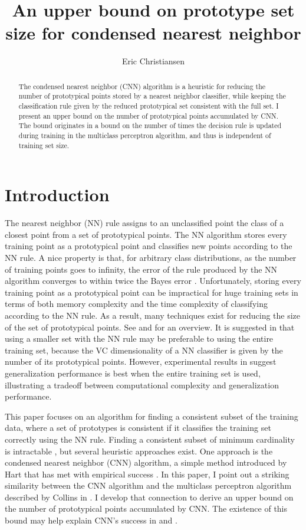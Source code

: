 \documentclass{article}
\title{An upper bound on prototype set size for condensed nearest neighbor}
\author{Eric Christiansen}
\begin{document}
\maketitle


\begin{abstract}
The condensed nearest neighbor (CNN) algorithm is a heuristic for reducing the number of prototypical points stored by a nearest neighbor classifier, while keeping the classification rule given by the reduced prototypical set consistent with the full set.
I present an upper bound on the number of prototypical points accumulated by CNN. The bound originates in a bound on the number of times the decision rule is updated during training in the multiclass perceptron algorithm, and thus is independent of training set size.
\end{abstract}

\section{Introduction}
The nearest neighbor (NN) rule assigns to an unclassified point the class of a closest point from a set of prototypical points. The NN algorithm stores every training point as a prototypical point and classifies new points according to the NN rule. 
A nice property is that, for arbitrary class distributions, as the number of training points goes to infinity, the error of the rule produced by the NN algorithm converges to within twice the Bayes error \cite{Devroye}. 
Unfortunately, storing every training point as a prototypical point can be impractical for huge training sets in terms of both memory complexity and the time complexity of classifying according to the NN rule. As a result, many techniques exist for reducing the size of the set of prototypical points. See \cite{Wilson} and \cite{Toussaint} for an overview. It is suggested in \cite{Angiulli} that using a smaller set with the NN rule may be preferable to using the entire training set, because the VC dimensionality of a NN classifier is given by the number of its prototypical points. However, experimental results in \cite{Wilson} suggest generalization performance is best when the entire training set is used, illustrating a tradeoff between computational complexity and generalization performance. 

This paper focuses on an algorithm for finding a consistent subset of the training data, where a set of prototypes is consistent if it classifies the training set correctly using the NN rule. Finding a consistent subset of minimum cardinality is intractable \cite{Wilfong}, but several heuristic approaches exist. One approach is the condensed nearest neighbor (CNN) algorithm, a simple method introduced by Hart \cite{HartCNN} that has met with empirical success \cite{Angiulli}\cite{Wilson}. In this paper, I point out a striking similarity between the CNN algorithm and the multiclass perceptron algorithm described by Collins in \cite{CollinsPerceptron}. I develop that connection to derive an upper bound on the number of prototypical points accumulated by CNN. 
The existence of this bound may help explain CNN's success in \cite{Angiulli} and \cite{Wilson}.
\end{document}
